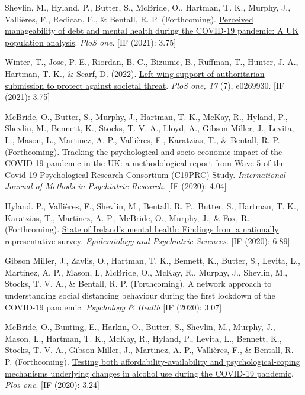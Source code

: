 \documentclass[12pt]{article}
\begin{document}
\begin{bibenum}
\item Shevlin, M., Hyland, P., Butter, S., 
		McBride, O., Hartman, T. K., Murphy, J., 
		Vallières, F., Redican, E., \& Bentall, R. P. (Forthcoming). 
		\href{}{Perceived manageability of debt and mental health 
		during the COVID-19 pandemic: A UK population analysis}.
		\textit{PloS one}.
		[IF (2021): 3.75]
		

\item Winter, T., Jose, P. E., Riordan, B. C., 
		Bizumic, B., Ruffman, T., Hunter, J. A., 
		Hartman, T. K., \& Scarf, D. (2022). 
		\href{https://doi.org/10.1371/journal.pone.0269930}
		{Left-wing support of authoritarian submission 
		to protect against societal threat}. 
		\textit{PloS one, 17} (7), e0269930. 
		[IF (2021): 3.75]

\item McBride, O., Butter, S., Murphy, J., 
	Hartman, T. K., McKay, R., Hyland, P., 
	Shevlin, M., Bennett, K., Stocks, T. V. A., 
	Lloyd, A., Gibson Miller, J., Levita, L., 
	Mason, L., Martinez, A. P.,  
	Vallières, F., Karatzias, T., 
	\& Bentall, R. P. (Forthcoming). 
	\href{}
	{Tracking the psychological and socio-economic 
	impact of the COVID-19 pandemic in the UK: 
	a methodological report from Wave 5 of the 
	Covid-19 Psychological Research Consortium 
	(C19PRC) Study}.  
	\emph{International Journal of Methods 
	in Psychiatric Research}. [IF (2020): 4.04]

	\item Hyland. P., Vallières, F., Shevlin, M., 
	Bentall, R. P., Butter, S., Hartman, T. K.,  
	Karatzias, T., Martinez, A. P., McBride, O., 
	Murphy, J., \& Fox, R. (Forthcoming). 
	\href{}
	{State of Ireland's mental health: Findings from a nationally representative survey}. 
	\emph{Epidemiology and Psychiatric Sciences}. [IF (2020): 6.89]


\item Gibson Miller, J., Zavlis, O., Hartman, T. K., Bennett, K., Butter, S., Levita, L., Martinez, A. P., Mason, L, McBride, O., McKay, R., Murphy, J., 
	Shevlin, M., Stocks, T. V. A., \& Bentall, R. P. (Forthcoming). A network approach to understanding social distancing behaviour during the first lockdown of the COVID-19 pandemic. \textit{Psychology \& Health} [IF (2020): 3.07]

\item McBride, O., Bunting, E., Harkin, O., Butter, S.,  Shevlin, M., Murphy, J., Mason, L., Hartman, T. K., McKay, R., Hyland, P., Levita, L.,  Bennett, K., Stocks, T. V. A., Gibson Miller, J., Martinez, A. P., Vallières, F., \& Bentall, R. P. (Forthcoming). \href{https://psyarxiv.com/xby9r/}{Testing both affordability-availability and psychological-coping mechanisms underlying changes in alcohol use during the COVID-19 pandemic}.
	\emph{Plos one}. [IF (2020): 3.24]


\end{bibenum}
\end{document}
